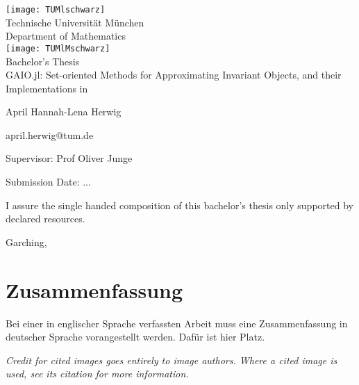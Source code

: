\pagestyle{empty}
\begin{titlepage}
\begin{center}
\texttt{[image: TUMlschwarz]}\\[3mm]
\sf
{\Large
  Technische Universit\"at M\"unchen\\[5mm]
  Department of Mathematics\\[8mm]
}
\normalsize
\texttt{[image: TUMlMschwarz]}\\[15mm]

Bachelor's Thesis\\[15mm]

{\LARGE
  GAIO.jl: Set-oriented Methods for Approximating Invariant Objects, and their Implementations in {\Huge \julia}
}
\bigskip

\normalsize

April Hannah-Lena Herwig

april.herwig@tum.de
\end{center}
\vspace*{75mm}

Supervisor: Prof Oliver Junge
\medskip

Submission Date: ... %

\end{titlepage}

\vspace*{150mm}

I assure the single handed composition of this bachelor's thesis only supported by declared resources.
\bigskip

Garching, %
\newpage
\section*{Zusammenfassung}
Bei einer in englischer Sprache verfassten Arbeit muss eine Zusammenfassung in deutscher Sprache vorangestellt werden.
Daf\"ur ist hier Platz.

\newpage
\tableofcontents
\vspace*{10ex}

\begin{remark}
  \textit{
      Credit for cited images goes entirely to image authors.
      Where a cited image is used, see its citation for more information.
  }
\end{remark}

\newpage
